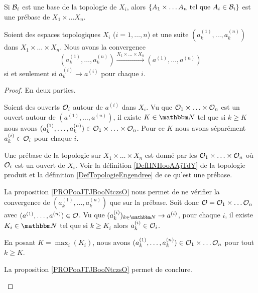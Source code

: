 \begin{lemma}       \label{LEMooKJJNooMHNcSP}
    Si \( \mathcal{B}_i\) est une base de la topologie de \( X_i\), alors \( \{ A_1\times \ldots A_n \text{ tel que } A_i\in \mathcal{B}_i\}\) est une prébase de \( X_1\times \ldots X_n\).
\end{lemma}

\begin{proposition}
    Soient des espaces topologiques \( X_i\) (\( i=1,\ldots, n\)) et une suite \( (a^{(1)}_k,\ldots, a^{(n)}_k)\) dans \( X_1\times\ldots \times X_n\). Nous avons la convergence
    \begin{equation}
        (a^{(1)}_k,\ldots, a^{(n)}_k)\stackrel{X_1\times\ldots \times X_n}{\longrightarrow}(a^{(1)},\ldots, a^{(n)})
    \end{equation}
    si et seulement si \( a^{(i)}_k\to a^{(i)}\) pour chaque \( i\).
\end{proposition}

\begin{proof}
    En deux parties.
    \begin{subproof}
        \item[Sens direct]
            Soient des ouverts \( \mathcal{O}_i\) autour de \( a^{(i)}\) dans \( X_i\). Vu que \( \mathcal{O}_1\times \ldots\times \mathcal{O}_n\) est un ouvert autour de \( (a^{(1)},\ldots, a^{(n)})\), il existe \( K\in \eN\) tel que si \( k\geq K\) nous avons \( (a^{(1)}_k,\ldots, a^{(n)}_k)\in \mathcal{O}_1\times \ldots \times \mathcal{O}_n\). Pour ce \( K\) nous avons séparément \( a^{(i)}_k\in \mathcal{O}_i\) pour chaque \( i\).

        \item[Sens inverse]
            Une prébase de la topologie sur \( X_1\times \ldots\times X_n\) est donné par les \( \mathcal{O}_1\times \ldots \times \mathcal{O}_n\) où \( \mathcal{O}_i\) est un ouvert de \( X_i\). Voir la définition \ref{DefIINHooAAjTdY} de la topologie produit et la définition \ref{DefTopologieEngendree} de ce qu'est une prébase.

            La proposition \ref{PROPooJTJBooNtczsO} nous permet de ne vérifier la convergence de \( (a^{(1)}_k,\ldots, a^{(n)}_k)\) que sur la prébase. Soit donc \(\mathcal{O}= \mathcal{O}_1\times \ldots \mathcal{O}_n\) avec \( (a^{(1)},\ldots, a^{(n)})\in \mathcal{O}\). Vu que \( (a^{(i)}_k)_{k\in \eN}\to a^{(i)}\), pour chaque \( i\), il existe \( K_i\in \eN\) tel que si \( k\geq K_i\) alors \( a^{(i)}_k\in \mathcal{O}_i\).

            En posant \( K=\max_i(K_i)\), nous avons \( (a^{(1)}_k,\ldots, a^{(n)}_k)\in \mathcal{O}_1\times \ldots \mathcal{O}_n\) pour tout \( k\geq K\).

            La proposition \ref{PROPooJTJBooNtczsO} permet de conclure.
    \end{subproof}
\end{proof}


